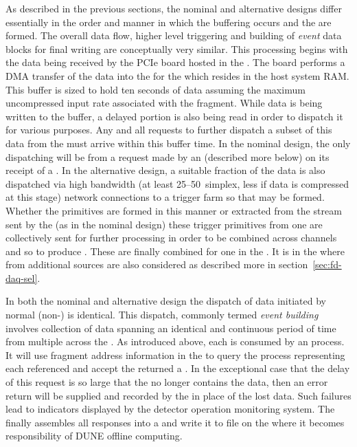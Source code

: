 As described in the previous sections, the nominal and alternative
designs differ essentially in the order and manner in which the
 buffering occurs and the  are
formed. 
The overall data flow, higher level triggering and building of
\textit{event} data blocks for final writing are conceptually very similar.
This processing begins with the data being received by the
 PCIe board hosted in the . 
The  board performs a DMA transfer of the data into the
 for the  which resides in the
 host system RAM.  %
This buffer is sized to hold ten seconds of data assuming the maximum 
uncompressed input rate associated with the fragment.
While data is being written to the buffer, a delayed portion is
also being read in order to dispatch it for various purposes.
Any and all requests to further dispatch a subset of this data from
the  must arrive within this buffer time.
In the nominal design, the only dispatching will be from a request
made by an  (described more below) on its receipt of a
. 
In the alternative design, a suitable fraction of the data is also
dispatched via high bandwidth (at least \numrange{25}{50}\,\si{\Gbps} simplex, less
if data is compressed at this stage) network connections to a trigger
farm so that  may be formed. 
Whether the primitives are formed in this manner or extracted from the
stream sent by the  (as in the nominal design) these
trigger primitives from one  are collectively sent for
further processing in order to be combined across channels and so to
produce . 
These are finally combined for one  in the
. 
It is in the  where  from additional
sources are also considered as described more in
section~\ref{sec:fd-daq-sel}.

In both the nominal and alternative design the dispatch of data
initiated by normal (non-)  is
identical. 
This dispatch, commonly termed \textit{event building} involves collection
of data spanning an identical and continuous period of time from
multiple  across the .
As introduced above, each  is consumed by an
 process. 
It will use fragment address information in the  to
query the  process representing each referenced
 and accept the returned a .
In the exceptional case that the delay of this request is so large
that the  no longer contains the data, then an error
return will be supplied and recorded by the  in place of the
lost data. 
Such failures lead to indicators displayed by the detector operation
monitoring system.
The  finally assembles all responses into a
 and write it to file on the  where
it becomes responsibility of DUNE offline computing.

